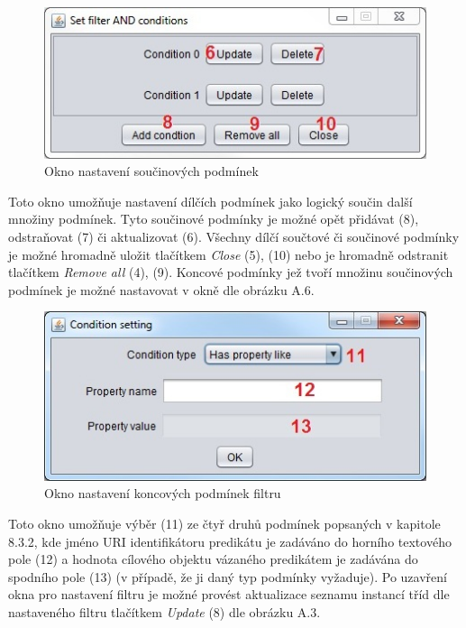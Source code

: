 \documentclass{projekt}
\begin{document}
\begin{figure}[htb!]
\begin{center}
\includegraphics[scale=0.8]{manualTestFilterB.jpg}
\caption{Okno nastavení součinových podmínek}
\end{center}
\end{figure}

Toto okno umožňuje nastavení dílčích podmínek jako logický součin další množiny podmínek. Tyto součinové podmínky je možné opět přidávat (8), odstraňovat (7) či aktualizovat (6). Všechny dílčí součtové či součinové podmínky je možné hromadně uložit tlačítkem {\it Close} (5), (10) nebo je hromadně odstranit tlačítkem {\it Remove all} (4), (9). 
Koncové podmínky jež tvoří množinu součinových podmínek je možné nastavovat v okně dle obrázku A.6.



\begin{figure}[htb!]
\begin{center}
\includegraphics[scale=0.8]{manualTestFilterC.jpg}
\caption{Okno nastavení koncových podmínek filtru}
\end{center}
\end{figure}

\thispagestyle{plain}

Toto okno umožňuje výběr (11) ze čtyř druhů podmínek popsaných v kapitole 8.3.2, kde jméno URI identifikátoru predikátu je zadáváno do horního textového pole (12) a hodnota cílového objektu vázaného predikátem je zadávána do spodního pole (13) (v případě, že ji daný typ podmínky vyžaduje).
Po uzavření okna pro nastavení filtru je možné provést aktualizace seznamu instancí tříd dle nastaveného filtru tlačítkem {\it Update} (8) dle obrázku A.3.
\end{document}
